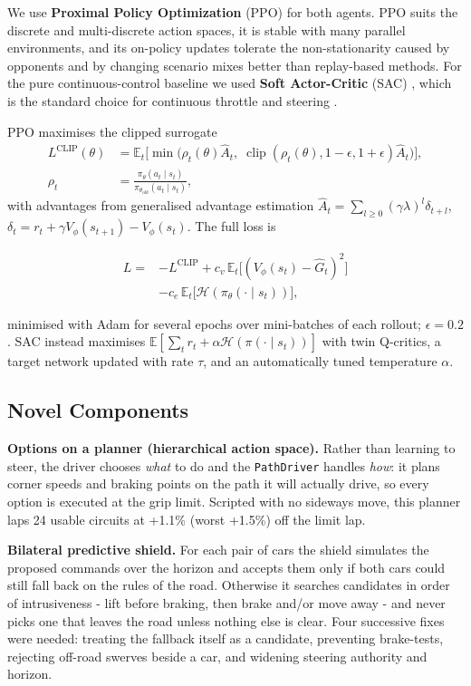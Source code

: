 \documentclass{ieeeaccess}
\begin{document}
We use \textbf{Proximal Policy Optimization} (PPO) \cite{b32} for both agents. PPO suits the
discrete and multi-discrete action spaces, it is stable with many parallel
environments, and its on-policy updates tolerate the non-stationarity caused by
opponents and by changing scenario mixes better than replay-based methods. For the
pure continuous-control baseline we used \textbf{Soft Actor-Critic} (SAC) \cite{b33}, which is
the standard choice for continuous throttle and steering \cite{b13}.

PPO maximises the clipped surrogate
\[\begin{aligned}
L^{\text{CLIP}}(\theta)&=\mathbb E_t\big[\min\big(\rho_t(\theta)\hat A_t,\;
\operatorname{clip}(\rho_t(\theta),1-\epsilon,1+\epsilon)\hat A_t\big)\big],\\
\rho_t&=\frac{\pi_\theta(a_t\mid s_t)}{\pi_{\theta_{\text{old}}}(a_t\mid s_t)},
\end{aligned}\]
with advantages from generalised advantage estimation \cite{b34}
\(\hat A_t=\sum_{l\ge0}(\gamma\lambda)^l\delta_{t+l}\),
\(\delta_t=r_t+\gamma V_\phi(s_{t+1})-V_\phi(s_t)\). The full loss is

\[\begin{aligned}
L={}&-L^{\text{CLIP}}+c_v\,\mathbb E_t\big[(V_\phi(s_t)-\hat G_t)^2\big]\\
&-c_e\,\mathbb E_t\big[\mathcal H(\pi_\theta(\cdot\mid s_t))\big],
\end{aligned}\]

minimised with Adam for several epochs over mini-batches of each rollout; \(\epsilon=0.2\).
SAC instead maximises \(\mathbb E[\sum_t r_t+\alpha\mathcal H(\pi(\cdot\mid s_t))]\)
with twin Q-critics, a target network updated with rate \(\tau\), and an automatically
tuned temperature \(\alpha\).

\subsection{Novel Components}

\textbf{Options on a planner (hierarchical action space).} Rather than learning to
steer, the driver chooses \emph{what} to do and the \texttt{PathDriver} handles \emph{how}: it plans
corner speeds and braking points on the path it will actually drive, so every
option is executed at the grip limit. Scripted with no sideways move, this planner
laps 24 usable circuits at +1.1\% (worst +1.5\%) off the limit lap.

\textbf{Bilateral predictive shield.} For each pair of cars the shield simulates the
proposed commands over the horizon and accepts them only if both cars could still
fall back on the rules of the road. Otherwise it searches candidates in order of
intrusiveness - lift before braking, then brake and/or move away - and never picks
one that leaves the road unless nothing else is clear. Four successive fixes were
needed: treating the fallback itself as a candidate, preventing brake-tests,
rejecting off-road swerves beside a car, and widening steering authority and
horizon.
\end{document}
